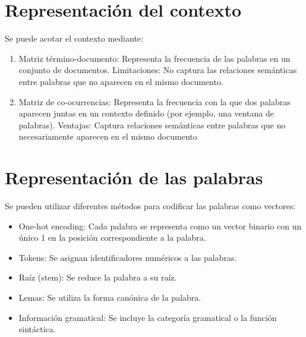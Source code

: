 \documentclass{report}
\begin{document}
\section{Representación del contexto}
Se puede acotar el contexto mediante:
\begin{enumerate}
    \item Matriz término-documento: Representa la frecuencia de las palabras en un conjunto de documentos.
            Limitaciones:  No captura las relaciones semánticas entre palabras que no aparecen en el mismo documento.
    \item Matriz de co-ocurrencias: Representa la frecuencia con la que dos palabras aparecen juntas en un contexto definido (por ejemplo, una ventana de palabras).
        Ventajas:  Captura relaciones semánticas entre palabras que no necesariamente aparecen en el mismo documento

\end{enumerate}

\section {Representación de las palabras}

Se pueden utilizar diferentes métodos para codificar las palabras como vectores:

\begin{itemize}
    \item One-hot encoding: Cada palabra se representa como un vector binario con un único 1 en la posición correspondiente a la palabra.
    \item Tokens: Se asignan identificadores numéricos a las palabras.
    \item Raíz (stem): Se reduce la palabra a su raíz.
    \item Lemas: Se utiliza la forma canónica de la palabra.
    \item Información gramatical: Se incluye la categoría gramatical o la función sintáctica.
\end{itemize}
\end{document}
